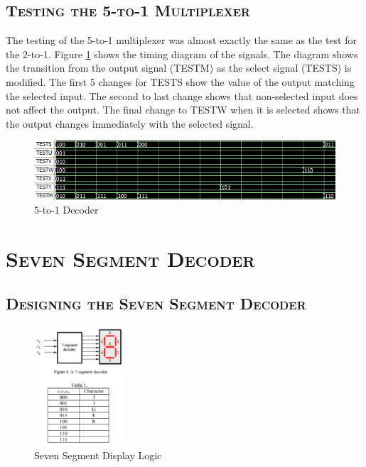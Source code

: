 \documentclass[11pt]{report}
\begin{document}
\begin{spacing}{1.5}
\subsection{\scshape Testing the 5-to-1 Multiplexer} %
\label{sub:test_5to1}

The testing of the 5-to-1 multiplexer was almost exactly the same as the test for the 2-to-1.  Figure \ref{fig:timing_1b} shows the timing diagram of the signals.  The diagram shows the transition from the output signal (TESTM) as the select signal (TESTS) is modified.  The first 5 changes for TESTS show the value of the output matching the selected input.  The second to last change shows that non-selected input does not affect the output.  The final change to TESTW when it is selected shows that the output changes immediately with the selected signal.

\vspace{30px}
\begin{figure}[H]
    \centering
    \includegraphics[width=1\textwidth]{TB1b}
    \caption{5-to-1 Decoder}
    \label{fig:timing_1b}
\end{figure}

\section{\scshape Seven Segment Decoder}
\label{sec:seven_segment_decoder}

\subsection{\scshape Designing the Seven Segment Decoder} %
\label{sub:design_ssd}

\vspace{30px}
\begin{figure}[H]
    \centering
    \includegraphics[width=0.3\textwidth]{ssd}
    \caption{Seven Segment Display Logic}
    \label{fig:ssd}
\end{figure}


\end{spacing}
\end{document}
